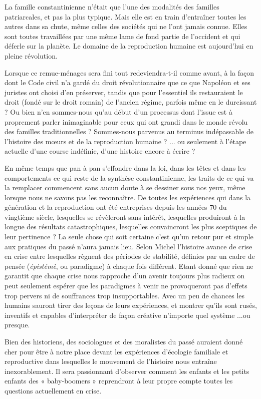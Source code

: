  La famille constantinienne n'était que l'une des modalités des familles patriarcales, et pas la plus typique. Mais elle est en train d'entraîner toutes les autres dans sa chute, même celles des sociétés qui ne l'ont jamais connue. Elles sont toutes travaillées par une même lame de fond partie de l'occident et qui déferle sur la planète. Le domaine de la reproduction humaine est aujourd'hui en pleine révolution.
  
 Lorsque ce remue-ménages sera fini tout redeviendra-t-il comme avant, à la façon dont le Code civil n'a gardé du droit révolutionnaire que ce que Napoléon et ses juristes ont choisi d'en préserver, tandis que pour l'essentiel ils restauraient le droit (fondé sur le droit romain) de l'ancien régime, parfois même en le durcissant ? Ou bien n'en sommes-nous qu'au début d'un processus dont l'issue est à proprement parler inimaginable pour ceux qui ont grandi dans le monde révolu des familles traditionnelles ? Sommes-nous parvenus au terminus indépassable de l'histoire des mœurs et de la reproduction humaine ? ... ou seulement à l'étape actuelle d'une course indéfinie, d'une histoire encore à écrire ? 
 
 

 En même temps que pan à pan s'effondre dans la loi, dans les têtes et dans les comportements ce qui reste de la synthèse constantinienne, les traits de ce qui va la remplacer commencent sans aucun doute à se dessiner sous nos yeux, même lorsque nous ne savons pas les reconnaître. De toutes les expériences qui dans la génération et la reproduction ont été entreprises depuis les années 70 du vingtième siècle, lesquelles se révèleront sans intérêt, lesquelles produiront à la longue des résultats catastrophiques, lesquelles convaincront les plus sceptiques de leur pertinence ?  La seule chose qui soit certaine c'est qu'un retour pur et simple aux pratiques du passé n'aura jamais lieu.  Selon Michel  l'histoire avance de crise en crise entre lesquelles règnent des périodes de stabilité, définies par un cadre de pensée (\emph{épistémè}, ou paradigme) à chaque fois différent. Etant donné que rien ne garantit que chaque crise nous rapproche d'un avenir toujours plus radieux on peut seulement espérer que les paradigmes à venir ne provoqueront pas d'effets trop pervers ni de souffrances trop insupportables. Avec un peu de chances les humains sauront tirer des leçons de leurs expériences, et montrer qu'ils sont rusés, inventifs et capables d'interpréter de façon créative n'importe quel système ...ou presque. 
 
 Bien des historiens, des sociologues et des moralistes du passé auraient donné cher pour être à notre place devant les expériences d'écologie familiale et reproductive dans lesquelles le mouvement de l'histoire nous entraîne inexorablement. Il sera passionnant d'observer comment les enfants et les petits enfants des « baby-boomers » reprendront à leur propre compte toutes les questions actuellement en crise.


